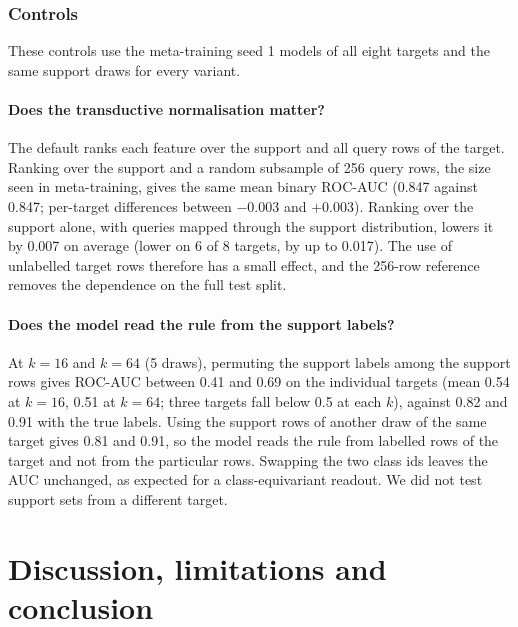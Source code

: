 \documentclass[11pt]{article}
\begin{document}
\subsubsection{Controls}\label{sec:fewcontrols}
These controls use the meta-training seed 1 models of all eight targets and the same support draws for every variant.

\paragraph{Does the transductive normalisation matter?}
The default ranks each feature over the support and all query rows of the target. Ranking over the support and a random subsample of 256 query rows, the size seen in meta-training, gives the same mean binary ROC-AUC (0.847 against 0.847; per-target differences between $-0.003$ and $+0.003$). Ranking over the support alone, with queries mapped through the support distribution, lowers it by 0.007 on average (lower on 6 of 8 targets, by up to 0.017). The use of unlabelled target rows therefore has a small effect, and the 256-row reference removes the dependence on the full test split.

\paragraph{Does the model read the rule from the support labels?}
At $k{=}16$ and $k{=}64$ (5 draws), permuting the support labels among the support rows gives ROC-AUC between 0.41 and 0.69 on the individual targets (mean 0.54 at $k{=}16$, 0.51 at $k{=}64$; three targets fall below 0.5 at each $k$), against 0.82 and 0.91 with the true labels. Using the support rows of another draw of the same target gives 0.81 and 0.91, so the model reads the rule from labelled rows of the target and not from the particular rows. Swapping the two class ids leaves the AUC unchanged, as expected for a class-equivariant readout. We did not test support sets from a different target.

\section{Discussion, limitations and conclusion}\label{sec:disc}
\end{document}
